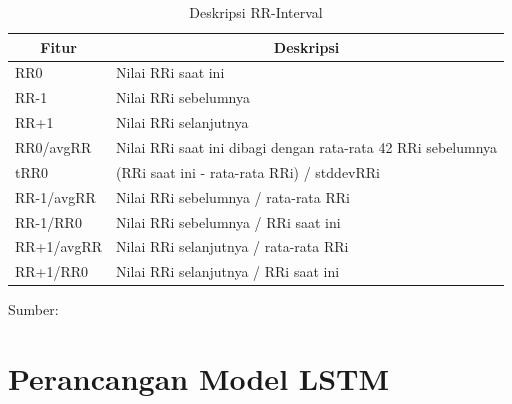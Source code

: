 \begin{table}[H]
  \caption{Deskripsi RR-Interval}
\begin{center}
\footnotesize
\begin{tabular}{|l @{\hspace{1cm}} |l|}
\hline
\multicolumn{1}{|c|}{\textbf{Fitur}} & \multicolumn{1}{c|}{\textbf{Deskripsi}}\\
\hline
RR0 & Nilai RRi saat ini\\
\hline
RR-1 & Nilai RRi sebelumnya\\
\hline
RR+1  & Nilai RRi selanjutnya\\
\hline
RR0/avgRR & Nilai RRi saat ini dibagi dengan rata-rata 42 RRi sebelumnya\\
\hline
tRR0  & (RRi saat ini - rata-rata RRi) / stddevRRi\\
\hline
RR-1/avgRR & Nilai RRi sebelumnya / rata-rata RRi\\
\hline
RR-1/RR0 & Nilai RRi sebelumnya / RRi saat ini\\
\hline
RR+1/avgRR & Nilai RRi selanjutnya / rata-rata RRi\\
\hline
RR+1/RR0 & Nilai RRi selanjutnya / RRi saat ini\\
\hline
\end{tabular}
\end{center}
\center
Sumber: \textcite{pramukantoroHeartbeatClassifierContinuous2022}
\label{tab:rri}
\end{table}


\section{Perancangan Model LSTM}
\label{subsec: bab4-pembuatan-model-lstm}





